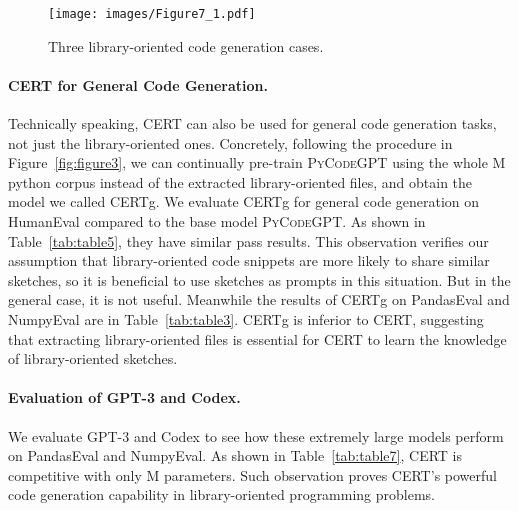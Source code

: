 \documentclass{article}
\newcommand{\cert}{\textsc{CERT}\xspace}
\newcommand{\certg}{\textsc{CERT}g\xspace}
\newcommand{\peval}{PandasEval\xspace}
\newcommand{\neval}{NumpyEval\xspace}
\newcommand{\codepy}{\textsc{PyCodeGPT}\xspace}
\begin{document}
\begin{figure*}[t]
    \small
    \centering
    \texttt{[image: images/Figure7\_1.pdf]}
\caption{Three library-oriented code generation cases.}
    \label{fig:figure6}
\end{figure*}

\paragraph{\cert for General Code Generation.}
Technically speaking, \cert can also be used for general code generation tasks, not just the library-oriented ones. Concretely, following the procedure in Figure~\ref{fig:figure3}, we can continually pre-train \codepy using the whole M python corpus instead of the extracted library-oriented files, and obtain the model we called \certg. We evaluate \certg for general code generation on HumanEval compared to the base model \codepy. As shown in Table~\ref{tab:table5}, they have similar pass results. This observation verifies our assumption that library-oriented code snippets are more likely to share similar sketches, so it is beneficial to use sketches as prompts in this situation. But in the general case, it is not useful. 
Meanwhile the results of \certg on \peval and \neval are in Table~\ref{tab:table3}. \certg is inferior to \cert, suggesting that extracting library-oriented files is essential for \cert to learn the knowledge of library-oriented sketches.

\paragraph{Evaluation of GPT-3 and Codex.}
We evaluate GPT-3 and Codex to see how these extremely large models perform on \peval and \neval. 
As shown in Table~\ref{tab:table7}, \cert is competitive with only M parameters. Such observation proves \cert's powerful code generation capability in library-oriented programming problems. 
\end{document}
